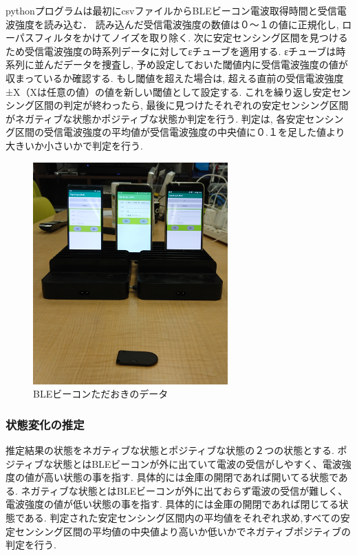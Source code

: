 \documentclass[Japanese]{dicomopapers}
\begin{document}
pythonプログラムは最初にcsvファイルからBLEビーコン電波取得時間と受信電波強度を読み込む．
読み込んだ受信電波強度の数値は０〜１の値に正規化し, ローパスフィルタをかけてノイズを取り除く.
次に安定センシング区間を見つけるため受信電波強度の時系列データに対してεチューブを適用する.
εチューブは時系列に並んだデータを捜査し, 予め設定しておいた閾値内に受信電波強度の値が収まっているか確認する.
もし閾値を超えた場合は, 超える直前の受信電波強度±X（Xは任意の値）の値を新しい閾値として設定する.
これを繰り返し安定センシング区間の判定が終わったら, 最後に見つけたそれぞれの安定センシング区間がネガティブな状態かポジティブな状態か判定を行う.
判定は, 各安定センシング区間の受信電波強度の平均値が受信電波強度の中央値に０.１を足した値より大きいか小さいかで判定を行う.


\begin{figure}[ht]
 \centering
 \includegraphics[width=7.5cm]{compare.jpg}
 \caption{BLEビーコンただおきのデータ}
 \label{compare}
\end{figure}


\subsubsection{状態変化の推定}
推定結果の状態をネガティブな状態とポジティブな状態の２つの状態とする.
ポジティブな状態とはBLEビーコンが外に出ていて電波の受信がしやすく、電波強度の値が高い状態の事を指す. 具体的には金庫の開閉であれば開いてる状態である.
ネガティブな状態とはBLEビーコンが外に出ておらず電波の受信が難しく、電波強度の値が低い状態の事を指す. 具体的には金庫の開閉であれば閉じてる状態である.
判定された安定センシング区間内の平均値をそれぞれ求め,すべての安定センシング区間の平均値の中央値より高いか低いかでネガティブポジティブの判定を行う.
\end{document}
